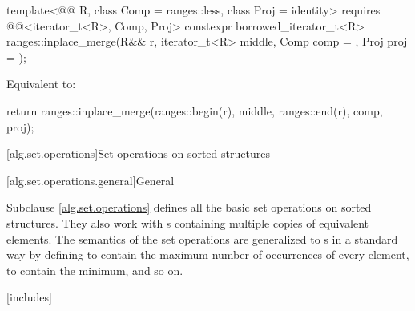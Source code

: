 \begin{itemdecl}
template<@@ R, class Comp = ranges::less, class Proj = identity>
  requires @@<iterator_t<R>, Comp, Proj>
  constexpr borrowed_iterator_t<R>
    ranges::inplace_merge(R&& r, iterator_t<R> middle, Comp comp = {}, Proj proj = {});
\end{itemdecl}

\begin{itemdescr}
\pnum
\effects
Equivalent to:
\begin{codeblock}
return ranges::inplace_merge(ranges::begin(r), middle, ranges::end(r), comp, proj);
\end{codeblock}
\end{itemdescr}

[alg.set.operations]{Set operations on sorted structures}

[alg.set.operations.general]{General}

\pnum
Subclause \ref{alg.set.operations} defines all the basic set operations on sorted structures.
They also work with s
containing multiple copies of equivalent elements.
The semantics of the set operations are generalized to s
in a standard way by defining 
to contain the maximum number of occurrences of every element,
 to contain the minimum, and so on.

[includes]{}

